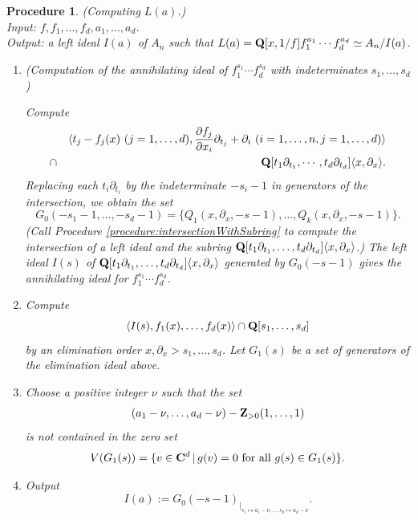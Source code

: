 \documentclass[12pt]{article}
\def\pd#1{ \partial_{#1} }
\def\C{{\bf C}}
\def\Q{{\bf Q}}
\newtheorem{procedure}[theorem]{Procedure}
\begin{document}
\begin{procedure} \rm \label{procedure:severalAnnihilator}
(Computing $L(a)$.)
\\

\noindent
Input: $f, f_1, \ldots, f_d, a_1, \ldots, a_d$. \\
Output: a left ideal $I(a)$ of $A_n$ such that 
$L(a) = \Q[x,1/f]f_1^{a_1} \cdots f_d^{a_d} \simeq A_n/I(a)$.

\begin{enumerate}
\item (Computation of the annihilating ideal of $f_1^{s_1} \cdots f_d^{s_d}$ 
with indeterminates $s_1,\dots,s_d$)
 

Compute
\begin{eqnarray*}
& &\langle t_j-f_j(x) \ (j=1, \ldots, d), 
                {{\partial f_j} \over
                 {\partial x_i}} \pd{t_j} + \pd{i} \ 
                (i=1, \ldots, n, j=1, \ldots, d) \rangle \\
&\cap&
\Q[ t_1 \pd{t_1}, \cdots, t_d \pd{t_d}] \langle x, \pd{x} \rangle.
\end{eqnarray*}
Replacing each $t_i \pd{t_i}$ by the indeterminate $-s_i-1$ in generators
of the intersection, 
we obtain the set
$$G_0(-s_1-1, \ldots, -s_d-1) =
\{ Q_1(x,\pd{x},-s-1), \ldots, Q_k(x,\pd{x},-s-1) \}.
$$
(Call Procedure \ref{procedure:intersectionWithSubring} 
to compute the intersection
of a left ideal and the subring 
$\Q[t_1\pd{t_1}, \ldots, t_d \pd{t_d}]\langle x, \pd{x}\rangle$.)
The left ideal $I(s)$ of
$\Q[t_1\pd{t_1}, \ldots, t_d \pd{t_d}]\langle x, \pd{x}\rangle$
generated by $G_0(-s-1)$ gives the annihilating ideal for
$ f_1^{s_1} \cdots f_d^{s_d}$.


\item
Compute 
$$  \langle I(s), f_1(x), \ldots, f_d(x) \rangle \cap \Q[s_1, \ldots, s_d] $$
by an elimination order $ x, \pd{x} > s_1, \ldots, s_d  $.
Let $G_1(s)$ be a set of generators of the elimination ideal above.

\item
Choose a positive integer $\nu$ such that the set
$$(a_1-\nu, \ldots, a_d-\nu) - {\bf Z}_{>0}(1, \ldots, 1) $$
is not contained in the zero set
$$V(G_1(s)) = \{ v \in \C^d \,|\,
  g(v) = 0  \mbox{ for all }  g(s) \in G_1(s)
\}.
$$

\item
Output
$$I(a):=G_0(-s-1)_{|_{ s_1 \mapsto a_1-\nu, \ldots, s_d \mapsto a_d-\nu}}. $$
\end{enumerate}
\end{procedure}
\end{document}
